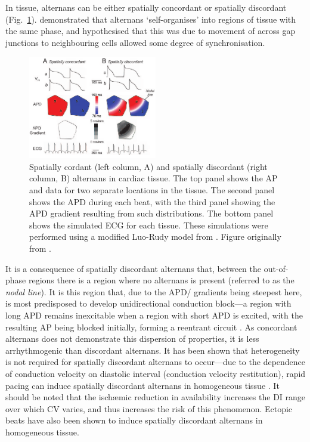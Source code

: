 \documentclass[../thesis-main.tex]{subfiles}
\begin{document}
In tissue, alternans can be either spatially concordant or spatially discordant (Fig.~\ref{fig:alternans}). \citet{Qian2001} demonstrated that \ca{} alternans `self-organises' into regions of tissue with the same phase, and hypothesised that this was due to movement of \ca{} across gap junctions to neighbouring cells allowed some degree of synchronisation.
\begin{figure}
 \centering
 \includegraphics[width=0.5\textwidth]{alternans}
 \caption[Spatially cordant and spatially discordant alternans in cardiac tissue]{Spatially cordant (left column, A) and spatially discordant (right column, B) alternans in cardiac tissue. The top panel shows the AP and \cai{} data for two separate locations in the tissue. The second panel shows the APD during each beat, with the third panel showing the APD gradient resulting from such distributions. The bottom panel shows the simulated ECG for each tissue. These simulations were performed using a modified Luo-Rudy model from \citet{Qu2000}. Figure originally from \citet{Weiss2006}.}
 \label{fig:alternans}
\end{figure}

It is a consequence of spatially discordant alternans that, between the out-of-phase regions there is a region where no alternans is present (referred to as the \emph{nodal line}). It is this region that, due to the APD/\cai{} gradients being steepest here, is most predisposed to develop unidirectional conduction block---a region with long APD remains inexcitable when a region with short APD is excited, with the resulting AP being blocked initially, forming a reentrant circuit \citep{Laurita2008}. As concordant alternans does not demonstrate this dispersion of properties, it is less arrhythmogenic than discordant alternans. It has been shown that heterogeneity is not required for spatially discordant alternans to occur---due to the dependence of conduction velocity on diastolic interval (conduction velocity restitution), rapid pacing can induce spatially discordant alternans in homogeneous tissue \citep{Watanabe2001}. It should be noted that the isch\ae{}mic reduction in \ina{} availability increases the DI range over which CV varies, and thus increases the risk of this phenomenon. Ectopic beats have also been shown to induce spatially discordant alternans in homogeneous tissue.
\end{document}
